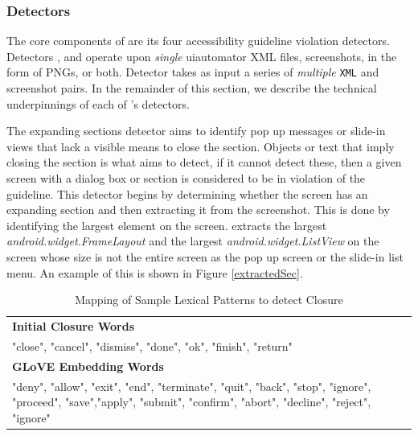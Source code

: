 \subsubsection{Detectors}

The core components of \MotorEase are its four accessibility guideline violation detectors. Detectors ,  and  operate upon \textit{single} uiautomator XML files, screenshots, in the form of PNGs, or both. Detector  takes as input a series of \textit{multiple} \texttt{\small XML} and screenshot pairs. In the remainder of this section, we describe the technical underpinnings of each of \MotorEase's detectors.




The expanding sections detector aims to identify pop up messages or slide-in views that lack a visible means to close the section. Objects or text that imply closing the section is what \MotorEase aims to detect, if it cannot detect these, then a given screen with a dialog box or section is considered to be in violation of the guideline. 
This detector begins by determining whether the screen has an expanding section and then extracting it from the screenshot. This is done by identifying the largest element on the screen. \MotorEase extracts the largest \emph{android.widget.FrameLayout} and the largest \emph{android.widget.ListView} on the screen whose size is not the entire screen as the pop up screen or the slide-in list menu. %
An example of this is shown in Figure \ref{extractedSec}.

\begin{table}[h]
\centering
\small
\renewcommand{\arraystretch}{2}
\caption{Mapping of Sample Lexical Patterns to detect Closure}

\label{tab:text-patterns}
\begin{tabular}{p{15cm}}
\hline
\textbf{Initial Closure Words}\\

"close", "cancel", "dismiss", "done", "ok", "finish", "return"\\
\hline
\textbf{GLoVE Embedding Words}\\

 "deny", "allow", "exit", "end", "terminate", "quit", "back", "stop", "ignore",  "proceed", "save","apply", "submit", "confirm", "abort", "decline", "reject", "ignore"\\
\hline
\end{tabular}
\end{table}

